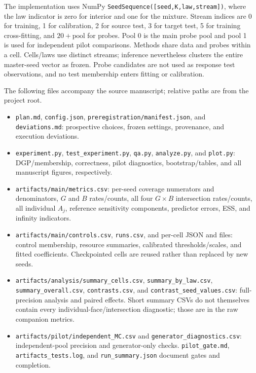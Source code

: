 \documentclass{article}
\theoremstyle{plain}
\begin{document}
The implementation uses NumPy \texttt{SeedSequence([seed,K,law,stream])}, where the law indicator is zero for interior and one for the mixture. Stream indices are 0 for training, 1 for calibration, 2 for source test, 3 for target test, 5 for training cross-fitting, and $20+\mathrm{pool}$ for probes. Pool 0 is the main probe pool and pool 1 is used for independent pilot comparisons. Methods share data and probes within a cell. Cells/laws use distinct streams; inference nevertheless clusters the entire master-seed vector as frozen. Probe candidates are not used as response test observations, and no test membership enters fitting or calibration.

The following files accompany the source manuscript; relative paths are from the project root.
\begin{itemize}
\item \texttt{plan.md}, \texttt{config.json}, \texttt{preregistration/manifest.json}, and \texttt{deviations.md}: prospective choices, frozen settings, provenance, and execution deviations.
\item \texttt{experiment.py}, \texttt{test\_experiment.py}, \texttt{qa.py}, \texttt{analyze.py}, and \texttt{plot.py}: DGP/membership, correctness, pilot diagnostics, bootstrap/tables, and all manuscript figures, respectively.
\item \texttt{artifacts/main/metrics.csv}: per-seed coverage numerators and denominators, $G$ and $B$ rates/counts, all four $G\times B$ intersection rates/counts, all individual $A_j$, reference sensitivity components, predictor errors, ESS, and infinity indicators.
\item \texttt{artifacts/main/controls.csv}, \texttt{runs.csv}, and per-cell JSON and \texttt{} files: control membership, resource summaries, calibrated thresholds/scales, and fitted coefficients. Checkpointed cells are reused rather than replaced by new seeds.
\item \texttt{artifacts/analysis/summary\_cells.csv}, \texttt{summary\_by\_law.csv}, \texttt{summary\_overall.csv}, \texttt{contrasts.csv}, and \texttt{contrast\_seed\_values.csv}: full-precision analysis and paired effects. Short summary CSVs do not themselves contain every individual-face/intersection diagnostic; those are in the raw companion metrics.
\item \texttt{artifacts/pilot/independent\_MC.csv} and \texttt{generator\_diagnostics.csv}: independent-pool precision and generator-only checks. \texttt{pilot\_gate.md}, \texttt{artifacts\_tests.log}, and \texttt{run\_summary.json} document gates and completion.
\end{itemize}
\end{document}
